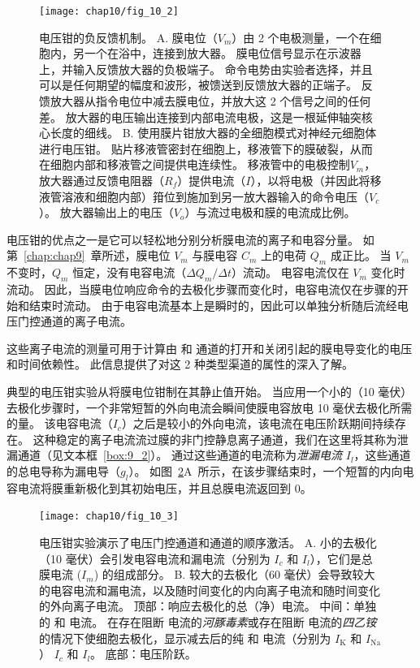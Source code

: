 \begin{figure}[htbp]
	\centering
	\texttt{[image: chap10/fig\_10\_2]}
	\caption{电压钳的负反馈机制。
	A. 膜电位（$V_m$）由 2 个电极测量，一个在细胞内，另一个在浴中，连接到放大器。
	膜电位信号显示在示波器上，并输入反馈放大器的负极端子。
	命令电势由实验者选择，并且可以是任何期望的幅度和波形，被馈送到反馈放大器的正端子。
	反馈放大器从指令电位中减去膜电位，并放大这 2 个信号之间的任何差。
	放大器的电压输出连接到内部电流电极，这是一根延伸轴突核心长度的细线。
	B. 使用膜片钳放大器的全细胞模式对神经元细胞体进行电压钳。
	贴片移液管密封在细胞上，移液管下的膜破裂，从而在细胞内部和移液管之间提供电连续性。
	移液管中的电极控制$V_m$，放大器通过反馈电阻器（$R_f$）提供电流（$I$），以将电极（并因此将移液管溶液和细胞内部）箝位到施加到另一放大器输入的命令电压（$V_c$）。
	放大器输出上的电压（$V_o$）与流过电极和膜的电流成比例。}
	\label{fig:10_2}
\end{figure}



电压钳的优点之一是它可以轻松地分别分析膜电流的离子和电容分量。
如第~\ref{chap:chap9}~章所述，膜电位 $V_m$ 与膜电容 $C_m$ 上的电荷 $Q_m$ 成正比。
当 $V_m$ 不变时，$Q_m$ 恒定，没有电容电流（$\Delta Q_m / \Delta t）$流动。
电容电流仅在 $V_m$ 变化时流动。
因此，当膜电位响应命令的去极化步骤而变化时，电容电流仅在步骤的开始和结束时流动。
由于电容电流基本上是瞬时的，因此可以单独分析随后流经电压门控通道的离子电流。


这些离子电流的测量可用于计算由  和  通道的打开和关闭引起的膜电导变化的电压和时间依赖性。
此信息提供了对这 2 种类型渠道的属性的深入了解。


典型的电压钳实验从将膜电位钳制在其静止值开始。
当应用一个小的（10 毫伏）去极化步骤时，一个非常短暂的外向电流会瞬间使膜电容放电 10 毫伏去极化所需的量。
该电容电流（$I_c$）之后是较小的外向电流，该电流在电压阶跃期间持续存在。
这种稳定的离子电流流过膜的非门控静息离子通道，我们在这里将其称为泄漏通道（见文本框~\ref{box:9_2}）。
通过这些通道的电流称为\textit{泄漏电流} $I_l$，这些通道的总电导称为漏电导（$g_l$）。
如图~\ref{fig:10_3}A~所示，在该步骤结束时，一个短暂的内向电容电流将膜重新极化到其初始电压，并且总膜电流返回到 0。


\begin{figure}[htbp]
	\centering
	\texttt{[image: chap10/fig\_10\_3]}
	\caption{电压钳实验演示了电压门控通道和通道的顺序激活。
		A. 小的去极化（10 毫伏）会引发电容电流和漏电流（分别为 $I_c$ 和 $I_l$），它们是总膜电流 ($I_m$) 的组成部分。
		B. 较大的去极化（60 毫伏）会导致较大的电容电流和漏电流，以及随时间变化的内向离子电流和随时间变化的外向离子电流。
		顶部：响应去极化的总（净）电流。
		中间：单独的  和  电流。
		在存在阻断  电流的\textit{河豚毒素}或存在阻断  电流的\textit{四乙铵}的情况下使细胞去极化，显示减去后的纯  和  电流（分别为 $I_\text{K}$ 和 $I_\text{Na}$） $I_c$ 和 $I_l$。
		底部：电压阶跃。}
	\label{fig:10_3}
\end{figure}


